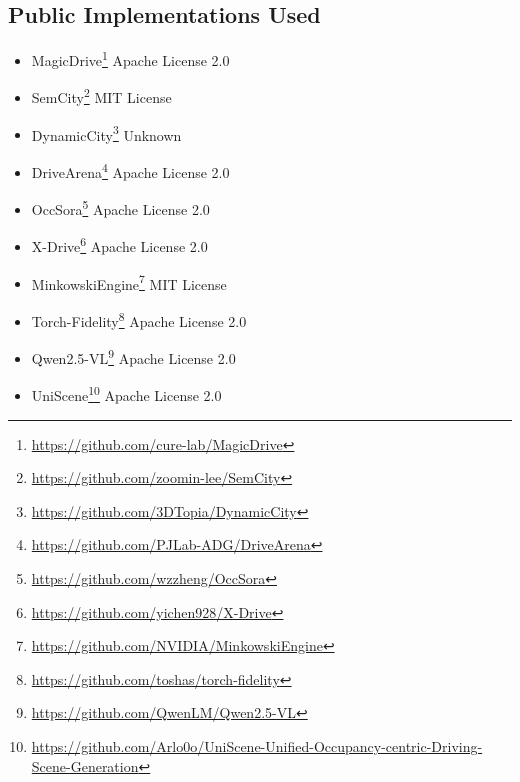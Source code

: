 \subsection{Public Implementations Used}
\begin{itemize}
    \item MagicDrive\footnote{\url{https://github.com/cure-lab/MagicDrive}} \dotfill Apache License 2.0
    
    \item SemCity\footnote{\url{https://github.com/zoomin-lee/SemCity}} \dotfill MIT License

    \item DynamicCity\footnote{\url{https://github.com/3DTopia/DynamicCity}} \dotfill Unknown

    \item DriveArena\footnote{\url{https://github.com/PJLab-ADG/DriveArena}} \dotfill Apache License 2.0

    \item OccSora\footnote{\url{https://github.com/wzzheng/OccSora}} \dotfill Apache License 2.0

    \item X-Drive\footnote{\url{https://github.com/yichen928/X-Drive}} \dotfill Apache License 2.0

    \item MinkowskiEngine\footnote{\url{https://github.com/NVIDIA/MinkowskiEngine}} \dotfill MIT License

    \item Torch-Fidelity\footnote{\url{https://github.com/toshas/torch-fidelity}} \dotfill Apache License 2.0

    \item Qwen2.5-VL\footnote{\url{https://github.com/QwenLM/Qwen2.5-VL}} \dotfill Apache License 2.0

    \item UniScene\footnote{\url{https://github.com/Arlo0o/UniScene-Unified-Occupancy-centric-Driving-Scene-Generation}} \dotfill Apache License 2.0
\end{itemize}